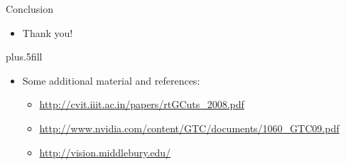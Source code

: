 \documentclass{beamer}
\begin{document}
\begin{frame}{Conclusion}

  \begin{itemize}
  \item
    \alert{Thank you!}
  \end{itemize}
  
  \vskip0pt plus.5fill
  \begin{itemize}
  \item
    Some additional material and references:
    \begin{itemize}
    \item
      \url{http://cvit.iiit.ac.in/papers/rtGCuts_2008.pdf}
    \item
      \url{http://www.nvidia.com/content/GTC/documents/1060_GTC09.pdf}
    \item
      \url{http://vision.middlebury.edu/}
    \end{itemize}
  \end{itemize}
\end{frame}
\end{document}
